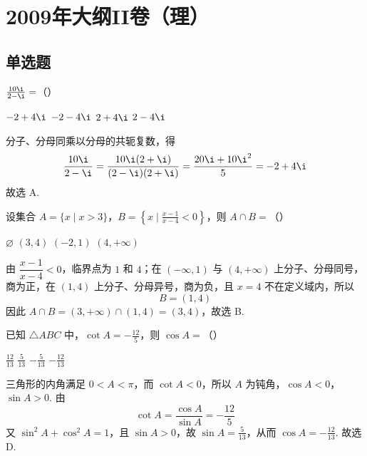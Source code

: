 \chapter{2009年大纲II卷（理）}

\section{单选题}

\begin{problem}
\(\frac{10\i}{2 - \i} =\)（\quad）

\choices
    {\(-2 + 4\i\)}
    {\(-2 - 4\i\)}
    {\(2 + 4\i\)}
    {\(2 - 4\i\)}

\begin{solution}
分子、分母同乘以分母的共轭复数，得
\[
\frac{10\i}{2-\i}=\frac{10\i(2+\i)}{(2-\i)(2+\i)}
=\frac{20\i+10\i^{2}}{5}=-2+4\i
\]
故选 A.
\end{solution}
\end{problem}

\begin{problem}
设集合 \(A = \{x \mid x > 3\}\)，\(B = \left\{x \mid \frac{x - 1}{x - 4} < 0\right\}\)，则 \(A \cap B =\)（\quad）

\choices
    {\(\varnothing\)}
    {\((3,4)\)}
    {\((-2,1)\)}
    {\((4, + \infty)\)}

\begin{solution}
由 \(\dfrac{x-1}{x-4}<0\)，临界点为 \(1\) 和 \(4\)；在 \((-\infty,1)\) 与 \((4,+\infty)\) 上分子、分母同号，商为正，在 \((1,4)\) 上分子、分母异号，商为负，且 \(x=4\) 不在定义域内，所以
\[
B=(1,4)
\]
因此 \(A\cap B=(3,+\infty)\cap(1,4)=(3,4)\)，故选 B.
\end{solution}
\end{problem}

\begin{problem}
已知 \(\triangle ABC\) 中，\(\cot A = -\frac{12}{5}\)，则 \(\cos A =\)（\quad）

\choices
    {\(\frac{12}{13}\)}
    {\(\frac{5}{13}\)}
    {\(-\frac{5}{13}\)}
    {\(-\frac{12}{13}\)}

\begin{solution}
三角形的内角满足 \(0<A<\pi\)，而 \(\cot A<0\)，所以 \(A\) 为钝角，\(\cos A<0\)，\(\sin A>0\). 由
\[
\cot A=\frac{\cos A}{\sin A}=-\frac{12}{5}
\]
又 \(\sin^{2}A+\cos^{2}A=1\)，且 \(\sin A>0\)，故 \(\sin A=\frac{5}{13}\)，从而 \(\cos A=-\frac{12}{13}\). 故选 D.
\end{solution}
\end{problem}


